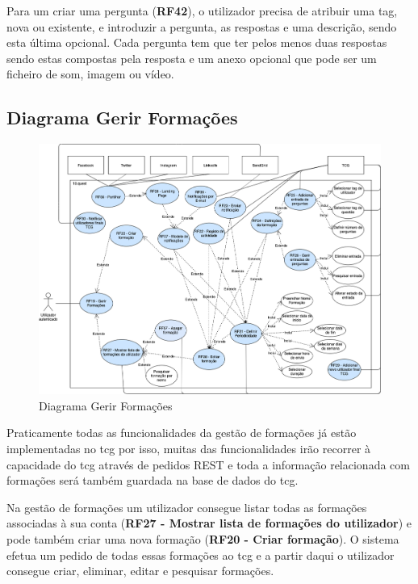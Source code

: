 Para um criar uma pergunta (\textbf{RF42}), o utilizador precisa de atribuir uma tag, nova ou existente, e introduzir a pergunta, as respostas e uma descrição, sendo esta última opcional. Cada pergunta tem que ter pelos menos duas respostas sendo estas compostas pela resposta e um anexo opcional que pode ser um ficheiro de som, imagem ou vídeo.



\newpage

\subsection{Diagrama Gerir Formações}
\label{d:formacoes}
\begin{figure}[ht!]
	\begin{center}
		\includegraphics[width=1\textwidth]{img/rf/gerir-formacoes}
		\caption{Diagrama Gerir Formações}
		\label{fig:rf-gerir-formacoes}
	\end{center}
\end{figure}

Praticamente todas as funcionalidades da gestão de formações já estão implementadas no \acrshort{tcg} por isso, muitas das funcionalidades irão recorrer à capacidade do \acrshort{tcg} através de pedidos REST e toda a informação relacionada com formações será também guardada na base de dados do \acrshort{tcg}.

Na gestão de formações um utilizador consegue listar todas as formações associadas à sua conta (\textbf{RF27 - Mostrar lista de formações do utilizador}) e pode também criar uma nova formação (\textbf{RF20 - Criar formação}). O sistema efetua um pedido de todas essas formações ao \acrshort{tcg} e a partir daqui o utilizador consegue criar, eliminar, editar e pesquisar formações.

